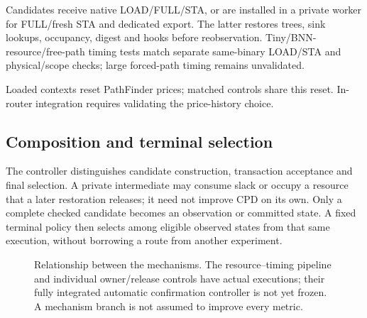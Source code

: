 \documentclass[conference,10pt]{IEEEtran}
\begin{document}
Candidates receive native LOAD/FULL/STA, or are installed in a private worker for FULL/fresh STA and dedicated export. The latter restores trees, sink lookups, occupancy, digest and hooks before reobservation. Tiny/BNN-resource/free-path timing tests match separate same-binary LOAD/STA and physical/scope checks; large forced-path timing remains unvalidated.

Loaded contexts reset PathFinder prices; matched controls share this reset. In-router integration requires validating the price-history choice.


\subsection{Composition and terminal selection}
The controller distinguishes candidate construction, transaction acceptance and final selection. A private intermediate may consume slack or occupy a resource that a later restoration releases; it need not improve CPD on its own. Only a complete checked candidate becomes an observation or committed state. A fixed terminal policy then selects among eligible observed states from that same execution, without borrowing a route from another experiment.

\begin{figure}[t]
\centering\footnotesize
{}
\caption{Relationship between the mechanisms. The resource--timing pipeline and individual owner/release controls have actual executions; their fully integrated automatic confirmation controller is not yet frozen. A mechanism branch is not assumed to improve every metric.}
\label{fig:method}
\end{figure}
\end{document}

